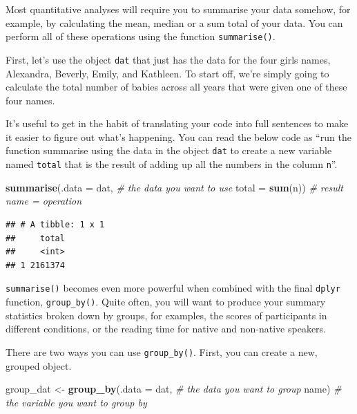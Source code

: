 \documentclass[]{book}
\newenvironment{Shaded}{\begin{snugshade}}{\end{snugshade}}
\newcommand{\CommentTok}[1]{\textcolor[rgb]{0.56,0.35,0.01}{\textit{#1}}}
\newcommand{\DataTypeTok}[1]{\textcolor[rgb]{0.13,0.29,0.53}{#1}}
\newcommand{\KeywordTok}[1]{\textcolor[rgb]{0.13,0.29,0.53}{\textbf{#1}}}
\newcommand{\NormalTok}[1]{#1}
\newcommand{\StringTok}[1]{\textcolor[rgb]{0.31,0.60,0.02}{#1}}
\begin{document}
Most quantitative analyses will require you to summarise your data somehow, for example, by calculating the mean, median or a sum total of your data. You can perform all of these operations using the function \texttt{summarise()}.

First, let's use the object \texttt{dat} that just has the data for the four girls names, Alexandra, Beverly, Emily, and Kathleen. To start off, we're simply going to calculate the total number of babies across all years that were given one of these four names.

It's useful to get in the habit of translating your code into full sentences to make it easier to figure out what's happening. You can read the below code as ``run the function summarise using the data in the object \texttt{dat} to create a new variable named \texttt{total} that is the result of adding up all the numbers in the column \texttt{n}''.

\begin{Shaded}
\begin{Highlighting}[]
\KeywordTok{summarise}\NormalTok{(}\DataTypeTok{.data =}\NormalTok{ dat, }\CommentTok{# the data you want to use}
          \DataTypeTok{total =} \KeywordTok{sum}\NormalTok{(n)) }\CommentTok{# result name = operation}
\end{Highlighting}
\end{Shaded}

\begin{verbatim}
## # A tibble: 1 x 1
##     total
##     <int>
## 1 2161374
\end{verbatim}

\texttt{summarise()} becomes even more powerful when combined with the final \texttt{dplyr} function, \texttt{group\_by()}. Quite often, you will want to produce your summary statistics broken down by groups, for examples, the scores of participants in different conditions, or the reading time for native and non-native speakers.

There are two ways you can use \texttt{group\_by()}. First, you can create a new, grouped object.

\begin{Shaded}
\begin{Highlighting}[]
\NormalTok{group_dat <-}\StringTok{ }\KeywordTok{group_by}\NormalTok{(}\DataTypeTok{.data =}\NormalTok{ dat, }\CommentTok{# the data you want to group}
\NormalTok{                      name) }\CommentTok{# the variable you want to group by}
\end{Highlighting}
\end{Shaded}
\end{document}

